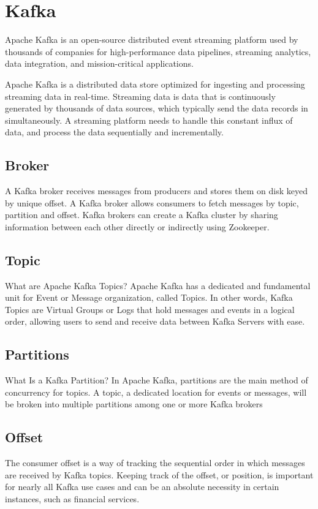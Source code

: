 \section{Kafka}
Apache Kafka is an open-source distributed event streaming platform used by thousands of companies for high-performance data pipelines, streaming analytics, data integration, and mission-critical applications.\autocite{ASF2022b}

Apache Kafka is a distributed data store optimized for ingesting and processing streaming data in real-time. Streaming data is data that is continuously generated by thousands of data sources, which typically send the data records in simultaneously. A streaming platform needs to handle this constant influx of data, and process the data sequentially and incrementally.
\autocite{AwsAmazon2023b}

\subsection{Broker}
A Kafka broker receives messages from producers and stores them on disk keyed by unique offset. A Kafka broker allows consumers to fetch messages by topic, partition and offset. Kafka brokers can create a Kafka cluster by sharing information between each other directly or indirectly using Zookeeper.\autocite{GitBook2023}

\subsection{Topic}
What are Apache Kafka Topics? Apache Kafka has a dedicated and fundamental unit for Event or Message organization, called Topics. In other words, Kafka Topics are Virtual Groups or Logs that hold messages and events in a logical order, allowing users to send and receive data between Kafka Servers with ease.\autocite{Ishwarya2022}

\subsection{Partitions}
What Is a Kafka Partition? In Apache Kafka, partitions are the main method of concurrency for topics. A topic, a dedicated location for events or messages, will be broken into multiple partitions among one or more Kafka brokers\autocite{Carder2022}

\subsection{Offset}
The consumer offset is a way of tracking the sequential order in which messages are received by Kafka topics. Keeping track of the offset, or position, is important for nearly all Kafka use cases and can be an absolute necessity in certain instances, such as financial services.\autocite{Dattell2023}


